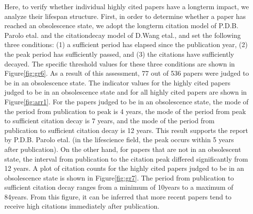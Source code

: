 Here, to verify whether individual highly cited papers have a longterm impact, we analyze their lifespan structure. First, in order to determine whether a paper has reached an obsolescence state, we adopt the longterm citation model of P.D.B. Parolo etal.\cite{Par1} and the citationdecay model of D.Wang etal.\cite{Wan1}, and set the following three conditions: (1) a sufficient period has elapsed since the publication year, (2) the peak period has sufficiently passed, and (3) the citations have sufficiently decayed.
The specific threshold values for these three conditions are shown in Figure\ref{fig:gr6}. As a result of this assessment, 77 out of 536 papers were judged to be in an obsolescence state. The indicator values for the highly cited papers judged to be in an obsolescence state and for all highly cited papers are shown in Figure\ref{fig:arr1}. For the papers judged to be in an obsolescence state, the mode of the period from publication to peak is 4 years, the mode of the period from peak to sufficient citation decay is 7 years, and the mode of the period from publication to sufficient citation decay is 12 years. This result supports the report by P.D.B. Parolo etal. (in the lifescience field, the peak occurs within 5 years after publication).
On the other hand, for papers that are not in an obsolescent state, the interval from publication to the citation peak differed significantly from 12 years.
A plot of citation counts for the highly cited papers judged to be in an obsolescence state is shown in Figure\ref{fig:gr7}. The period from publication to sufficient citation decay ranges from a minimum of 10years to a maximum of 84years. From this figure, it can be inferred that more recent papers tend to receive high citations immediately after publication.
